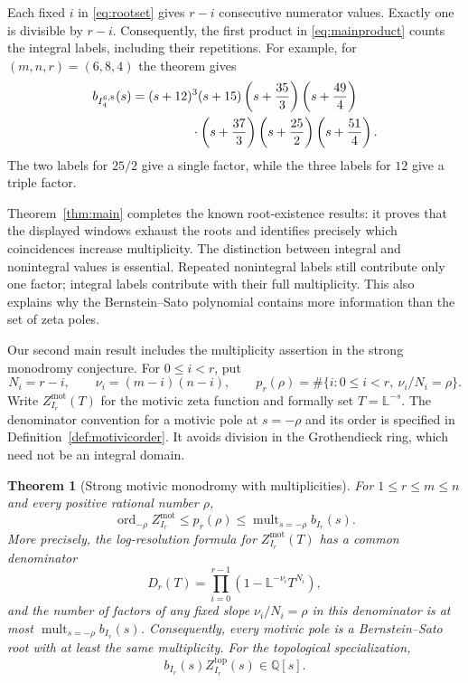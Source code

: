 \documentclass[11pt,a4paper]{article}
\numberwithin{equation}{section}
\newtheorem{maintheorem}{Theorem}
\theoremstyle{definition}
\DeclareMathOperator{\mult}{mult}
\begin{document}
Each fixed $i$ in \eqref{eq:rootset} gives $r-i$ consecutive numerator
values. Exactly one is divisible by $r-i$. Consequently, the first
product in \eqref{eq:mainproduct} counts the integral labels, including
their repetitions. For example, for $(m,n,r)=(6,8,4)$ the theorem gives
\begin{align*}
b_{I_4^{6,8}}(s)={}&(s+12)^3(s+15)
\left(s+\frac{35}{3}\right)\left(s+\frac{49}{4}\right)\\
&\hspace{12mm}\cdot\left(s+\frac{37}{3}\right)
\left(s+\frac{25}{2}\right)\left(s+\frac{51}{4}\right).
\end{align*}
The two labels for $25/2$ give a single factor, while the three labels
for $12$ give a triple factor.

Theorem~\ref{thm:main} completes the known root-existence results:
it proves that the displayed windows exhaust the roots and identifies
precisely which coincidences increase multiplicity. The distinction
between integral and nonintegral values is essential. Repeated
nonintegral labels still contribute only one factor; integral labels
contribute with their full multiplicity. This also explains why the
Bernstein--Sato polynomial contains more information than the set of
zeta poles.

Our second main result includes the multiplicity assertion in the
strong monodromy conjecture. For $0\le i<r$, put
\begin{equation}\label{eq:resolutionnumbers}
N_i=r-i,\qquad \nu_i=(m-i)(n-i),\qquad
p_r(\rho)=\#\{i:0\le i<r,\ \nu_i/N_i=\rho\}.
\end{equation}
Write $Z^{\mathrm{mot}}_{I_r}(T)$ for the motivic zeta function and
formally set $T=\mathbb L^{-s}$. The denominator convention for a
motivic pole at $s=-\rho$ and its order is specified in
Definition~\ref{def:motivicorder}. It avoids division in the
Grothendieck ring, which need not be an integral domain.

\begin{maintheorem}[Strong motivic monodromy with multiplicities]
\label{thm:strong}
For $1\le r\le m\le n$ and every positive rational number $\rho$,
\begin{equation}\label{eq:stronginequality}
\operatorname{ord}_{-\rho}Z^{\mathrm{mot}}_{I_r}
\le p_r(\rho)\le\mult_{s=-\rho}b_{I_r}(s).
\end{equation}
More precisely, the log-resolution formula for
$Z^{\mathrm{mot}}_{I_r}(T)$ has a common denominator
\begin{equation}\label{eq:motivicdenominator}
D_r(T)=\prod_{i=0}^{r-1}(1-\mathbb L^{-\nu_i}T^{N_i}),
\end{equation}
and the number of factors of any fixed slope $\nu_i/N_i=\rho$
in this denominator is at most $\mult_{s=-\rho}b_{I_r}(s)$.
Consequently, every motivic pole is a Bernstein--Sato root with at
least the same multiplicity. For the topological specialization,
\begin{equation}\label{eq:topologicalstrong}
b_{I_r}(s)Z^{\mathrm{top}}_{I_r}(s)\in\mathbb Q[s].
\end{equation}
\end{maintheorem}
\end{document}
